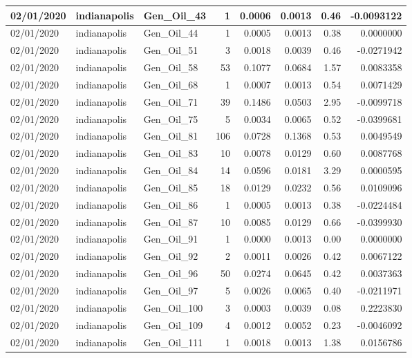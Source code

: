 \documentclass[
  letterpaper,
  DIV=11,
  numbers=noendperiod]{scrartcl}
\begin{document}
\begin{tabular}{l|l|l|r|r|r|r|r}
\hline
02/01/2020 & indianapolis & Gen\_Oil\_43 & 1 & 0.0006 & 0.0013 & 0.46 & -0.0093122\\
\hline
02/01/2020 & indianapolis & Gen\_Oil\_44 & 1 & 0.0005 & 0.0013 & 0.38 & 0.0000000\\
\hline
02/01/2020 & indianapolis & Gen\_Oil\_51 & 3 & 0.0018 & 0.0039 & 0.46 & -0.0271942\\
\hline
02/01/2020 & indianapolis & Gen\_Oil\_58 & 53 & 0.1077 & 0.0684 & 1.57 & 0.0083358\\
\hline
02/01/2020 & indianapolis & Gen\_Oil\_68 & 1 & 0.0007 & 0.0013 & 0.54 & 0.0071429\\
\hline
02/01/2020 & indianapolis & Gen\_Oil\_71 & 39 & 0.1486 & 0.0503 & 2.95 & -0.0099718\\
\hline
02/01/2020 & indianapolis & Gen\_Oil\_75 & 5 & 0.0034 & 0.0065 & 0.52 & -0.0399681\\
\hline
02/01/2020 & indianapolis & Gen\_Oil\_81 & 106 & 0.0728 & 0.1368 & 0.53 & 0.0049549\\
\hline
02/01/2020 & indianapolis & Gen\_Oil\_83 & 10 & 0.0078 & 0.0129 & 0.60 & 0.0087768\\
\hline
02/01/2020 & indianapolis & Gen\_Oil\_84 & 14 & 0.0596 & 0.0181 & 3.29 & 0.0000595\\
\hline
02/01/2020 & indianapolis & Gen\_Oil\_85 & 18 & 0.0129 & 0.0232 & 0.56 & 0.0109096\\
\hline
02/01/2020 & indianapolis & Gen\_Oil\_86 & 1 & 0.0005 & 0.0013 & 0.38 & -0.0224484\\
\hline
02/01/2020 & indianapolis & Gen\_Oil\_87 & 10 & 0.0085 & 0.0129 & 0.66 & -0.0399930\\
\hline
02/01/2020 & indianapolis & Gen\_Oil\_91 & 1 & 0.0000 & 0.0013 & 0.00 & 0.0000000\\
\hline
02/01/2020 & indianapolis & Gen\_Oil\_92 & 2 & 0.0011 & 0.0026 & 0.42 & 0.0067122\\
\hline
02/01/2020 & indianapolis & Gen\_Oil\_96 & 50 & 0.0274 & 0.0645 & 0.42 & 0.0037363\\
\hline
02/01/2020 & indianapolis & Gen\_Oil\_97 & 5 & 0.0026 & 0.0065 & 0.40 & -0.0211971\\
\hline
02/01/2020 & indianapolis & Gen\_Oil\_100 & 3 & 0.0003 & 0.0039 & 0.08 & 0.2223830\\
\hline
02/01/2020 & indianapolis & Gen\_Oil\_109 & 4 & 0.0012 & 0.0052 & 0.23 & -0.0046092\\
\hline
02/01/2020 & indianapolis & Gen\_Oil\_111 & 1 & 0.0018 & 0.0013 & 1.38 & 0.0156786\\

\end{tabular}
\end{document}
